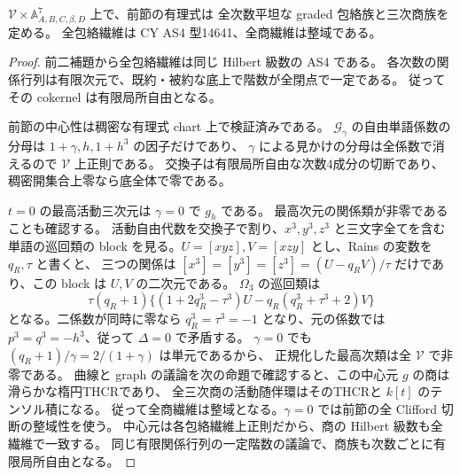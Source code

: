 \begin{proposition}
\label{prop:integrated-algebraic-flat}
$\mathcal V\times\mathbb A^7_{A,B,C,\beta,D}$ 上で、前節の有理式は
全次数平坦な graded 包絡族と三次商族を定める。
全包絡繊維は CY AS4 型14641、全商繊維は整域である。
\end{proposition}
\begin{proof}
前二補題から全包絡繊維は同じ Hilbert 級数の AS4 である。
各次数の関係行列は有限次元で、既約・被約な底上で階数が全閉点で一定である。
従ってその cokernel は有限局所自由となる。

前節の中心性は稠密な有理式 chart 上で検証済みである。
$\mathcal G_\gamma$ の自由単語係数の分母は $1+\gamma,h,1+h^3$ の因子だけであり、
$\gamma$ による見かけの分母は全係数で消えるので $\mathcal V$ 上正則である。
交換子は有限局所自由な次数4成分の切断であり、稠密開集合上零なら底全体で零である。

$t=0$ の最高活動三次元は $\gamma=0$ で $g_h$ である。
最高次元の関係類が非零であることも確認する。
活動自由代数を交換子で割り、$x^3,y^3,z^3$ と三文字全てを含む単語の巡回類の
block を見る。$U=[xyz],V=[xzy]$ とし、Rains の変数を $q_R,\tau$ と書くと、
三つの関係は $[x^3]=[y^3]=[z^3]=(U-q_RV)/\tau$ だけであり、この block は $U,V$ の二次元である。
$\Omega_3$ の巡回類は
\[
 \tau(q_R+1)\{(1+2q_R^3-\tau^3)U-q_R(q_R^3+\tau^3+2)V\}
\]
となる。二係数が同時に零なら $q_R^3=\tau^3=-1$ となり、元の係数では
$p^3=q^3=-h^3$、従って $\Delta=0$ で矛盾する。
$\gamma=0$ でも $(q_R+1)/\gamma=2/(1+\gamma)$ は単元であるから、
正規化した最高次類は全 $\mathcal V$ で非零である。
曲線と graph の議論を次の命題で確認すると、この中心元 $g$ の商は滑らかな楕円THCRであり、
全三次商の活動随伴環はそのTHCRと $k[t]$ のテンソル積になる。
従って全商繊維は整域となる。$\gamma=0$ では前節の全 Clifford 切断の整域性を使う。
中心元は各包絡繊維上正則だから、商の Hilbert 級数も全繊維で一致する。
同じ有限関係行列の一定階数の議論で、商族も次数ごとに有限局所自由となる。
\end{proof}

